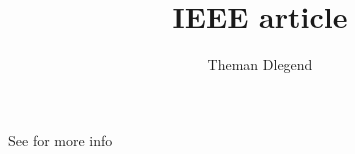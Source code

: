 \documentclass{IEEEtran}
\title{IEEE article}
\author{Theman Dlegend}
\begin{document}
\maketitle
\lipsum[1]
See \cite{8} for more info 


\end{document}
